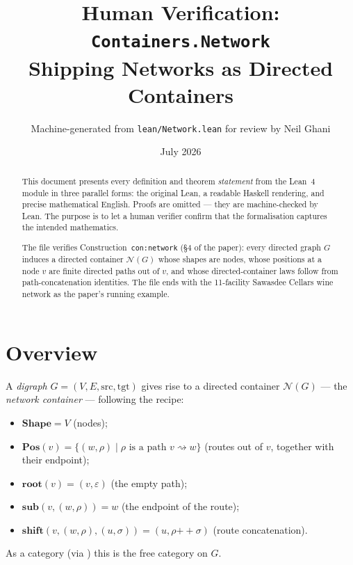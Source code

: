 \documentclass[11pt,a4paper]{article}
\title{Human Verification: \texttt{Containers.Network}\\[4pt]
  \large Shipping Networks as Directed Containers}
\author{Machine-generated from \texttt{lean/Network.lean} for review by Neil Ghani}
\date{July 2026}
\begin{document}
\maketitle

\begin{abstract}
This document presents every definition and theorem \emph{statement} from the
Lean~4 module  in three parallel forms: the original
Lean, a readable Haskell rendering, and precise mathematical English.  Proofs
are omitted --- they are machine-checked by Lean.  The purpose is to let a
human verifier confirm that the formalisation captures the intended
mathematics.

The file verifies Construction~\texttt{con:network} (\S4 of the paper): every
directed graph $G$ induces a directed container $\mathcal{N}(G)$ whose shapes
are nodes, whose positions at a node $v$ are finite directed paths out of $v$,
and whose directed-container laws follow from path-concatenation identities.
The file ends with the 11-facility Sawasdee Cellars wine network as the
paper's running example.
\end{abstract}

\tableofcontents
\bigskip

\section{Overview}

A \emph{digraph} $G = (V, E, \mathrm{src}, \mathrm{tgt})$ gives rise to a
directed container $\mathcal{N}(G)$ --- the \emph{network container} ---
following the recipe:
\begin{itemize}
  \item $\mathbf{Shape} = V$ (nodes);
  \item $\mathbf{Pos}(v) = \{(w, \rho) \mid \rho \text{ is a path } v \rightsquigarrow w\}$
    (routes out of $v$, together with their endpoint);
  \item $\mathbf{root}(v) = (v, \varepsilon)$ (the empty path);
  \item $\mathbf{sub}(v, (w, \rho)) = w$ (the endpoint of the route);
  \item $\mathbf{shift}(v, (w, \rho), (u, \sigma)) = (u, \rho \mathbin{+\!\!+} \sigma)$
    (route concatenation).
\end{itemize}
As a category (via ) this is the free category on $G$.
\end{document}
